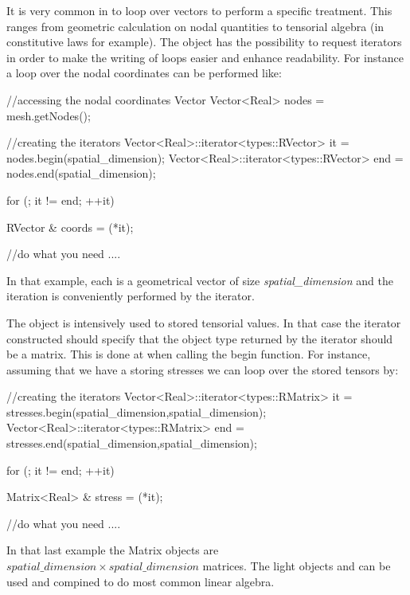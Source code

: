 It is very common in \akantu to loop over vectors to perform a specific 
treatment. This ranges from geometric calculation on nodal quantities 
to tensorial algebra (in constitutive laws for example).
The  object has the possibility to request iterators 
in order to make the writing of loops easier and enhance readability.
For instance a loop over the nodal coordinates can be performed like:
\begin{cpp}
  //accessing the nodal coordinates Vector
  Vector<Real> nodes = mesh.getNodes();
  
  //creating the iterators
  Vector<Real>::iterator<types::RVector> it  = nodes.begin(spatial_dimension);
  Vector<Real>::iterator<types::RVector> end = nodes.end(spatial_dimension);
  
  for (; it != end; ++it){
    RVector & coords = (*it);
    
    //do what you need
    ....
    
  }
\end{cpp}
In that example, each  is a geometrical vector of size \textit{spatial\_dimension}
and the iteration is conveniently performed by the  iterator.

The  object is intensively used to stored tensorial values.
In that case the iterator constructed should specify that the object type
returned by the iterator should be a matrix. This is done at when calling the 
begin function. For instance, assuming that we have a  storing 
stresses we can loop over the stored tensors by:

\begin{cpp}
  //creating the iterators
  Vector<Real>::iterator<types::RMatrix> it  = stresses.begin(spatial_dimension,spatial_dimension);
  Vector<Real>::iterator<types::RMatrix> end = stresses.end(spatial_dimension,spatial_dimension);
  
  for (; it != end; ++it){
    Matrix<Real> & stress = (*it);
    
    //do what you need
    ....
    
  }
\end{cpp}
In that last example the Matrix objects are 
$spatial\_dimension \times spatial\_dimension$ matrices.
The light objects  and  can be used and compined 
to do most common linear algebra.

